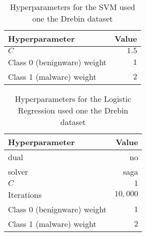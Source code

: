 \begin{table}[p]
	\centering
	\begin{tabular}{l r}
		Hyperparameter & Value \\
		\hline
		$C$ & $1.5$\\
		Class 0 (benignware) weight & $1$\\
		Class 1 (malware) weight & $2$\\
		\hline
	\end{tabular}
	\caption{Hyperparameters for the SVM used one the Drebin dataset}
	\label{tab:svmdrebin}
\end{table}

\begin{table}[p]
	\centering
	\begin{tabular}{l r}
		Hyperparameter & Value \\
		\hline
		dual & no\\
		solver & saga\\
		$C$ & $1$\\
		Iterations & $10,000$\\
		Class 0 (benignware) weight & $1$\\
		Class 1 (malware) weight & $2$\\
		\hline
	\end{tabular}
	\caption{Hyperparameters for the Logistic Regression used one the Drebin dataset}
	\label{tab:lrdrebin}
\end{table}